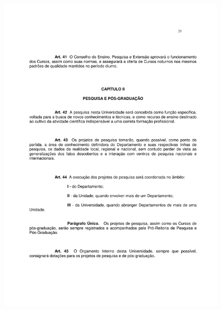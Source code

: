 \begin{figure}[p]
	\centering 
	\includegraphics[scale=0.7]{capitulos/resolucoes/cuni414/cuni414-21.pdf}
\end{figure} \pagebreak

